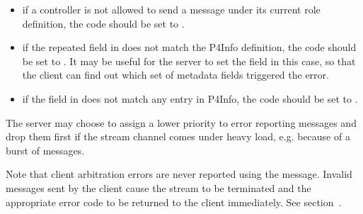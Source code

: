 \documentclass[11pt]{article}
\begin{document}
{%
\begin{itemize}[noitemsep,topsep=\mdcompacttopsep]%

\item{}if a controller is not allowed to send a  message under its
current role definition, the code should be set to .%

\item{}if the  repeated field in  does not match the P4Info
definition, the code should be set to . It may be useful
for the server to set the  field in this case, so that the client
can find out which set of metadata fields triggered the error.%

\item{}if the  field in  does not match any  entry
in P4Info, the code should be set to .%
\end{itemize}%

\noindent{}The server may choose to assign a lower priority to error reporting messages and
drop them first if the stream channel comes under heavy load, e.g. because of a
burst of  messages.%

Note that client arbitration errors are never reported using the 
message. Invalid  messages sent by the client cause the
stream to be terminated and the appropriate error code to be returned to the
client immediately. See section~.%

}
\end{document}
